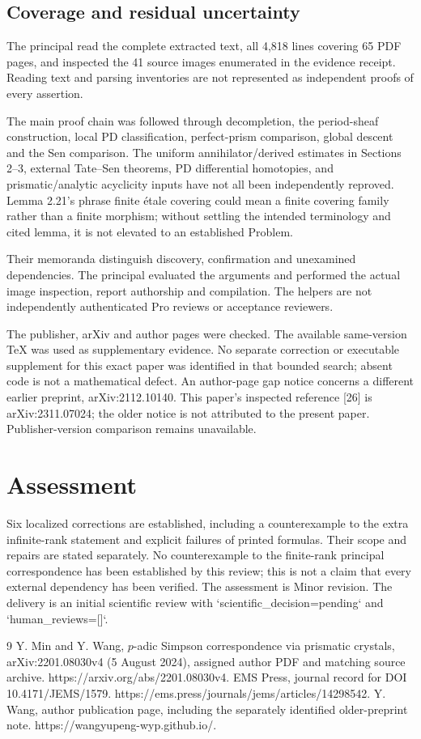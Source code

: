 \documentclass[10pt]{article}
\begin{document}
\subsection*{Coverage and residual uncertainty}
The principal read the complete extracted text, all 4,818 lines covering 65 PDF pages, and inspected the 41 source images enumerated in the evidence receipt. Reading text and parsing inventories are not represented as independent proofs of every assertion.\par
The main proof chain was followed through decompletion, the period-sheaf construction, local PD classification, perfect-prism comparison, global descent and the Sen comparison. The uniform annihilator/derived estimates in Sections 2–3, external Tate–Sen theorems, PD differential homotopies, and prismatic/analytic acyclicity inputs have not all been independently reproved. Lemma 2.21’s phrase finite étale covering could mean a finite covering family rather than a finite morphism; without settling the intended terminology and cited lemma, it is not elevated to an established Problem.\par
Their memoranda distinguish discovery, confirmation and unexamined dependencies. The principal evaluated the arguments and performed the actual image inspection, report authorship and compilation. The helpers are not independently authenticated Pro reviews or acceptance reviewers.\par
The publisher, arXiv and author pages were checked. The available same-version TeX was used as supplementary evidence. No separate correction or executable supplement for this exact paper was identified in that bounded search; absent code is not a mathematical defect. An author-page gap notice concerns a different earlier preprint, arXiv:2112.10140. This paper’s inspected reference [26] is arXiv:2311.07024; the older notice is not attributed to the present paper. Publisher-version comparison remains unavailable.\par
\section*{Assessment}
Six localized corrections are established, including a counterexample to the extra infinite-rank statement and explicit failures of printed formulas. Their scope and repairs are stated separately. No counterexample to the finite-rank principal correspondence has been established by this review; this is not a claim that every external dependency has been verified. The assessment is Minor revision. The delivery is an initial scientific review with `scientific\_decision=pending` and `human\_reviews=[]`.\par
9 Y. Min and Y. Wang, \(p\)-adic Simpson correspondence via prismatic crystals, arXiv:2201.08030v4 (5 August 2024), assigned author PDF and matching source archive. https://arxiv.org/abs/2201.08030v4. EMS Press, journal record for DOI 10.4171/JEMS/1579. https://ems.press/journals/jems/articles/14298542. Y. Wang, author publication page, including the separately identified older-preprint note. https://wangyupeng-wyp.github.io/.\par
\end{document}
